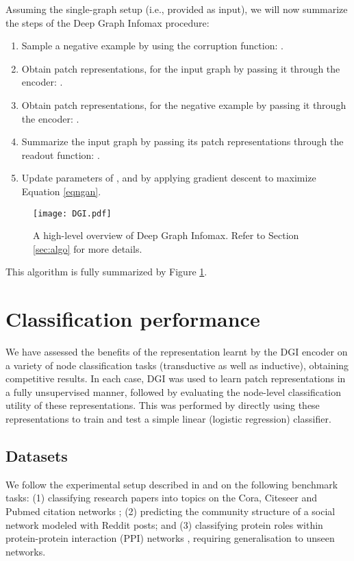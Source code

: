 \documentclass{article} \usepackage{iclr2019_conference,times}
\begin{document}
Assuming the single-graph setup (i.e.,  provided as input), we will now summarize the steps of the Deep Graph Infomax procedure:
\begin{enumerate}
	\item Sample a negative example by using the corruption function: .
	\item Obtain patch representations,  for the input graph by passing it through the encoder: .
	\item Obtain patch representations,  for the negative example by passing it through the encoder: .
	\item Summarize the input graph by passing its patch representations through the readout function: .
	\item Update parameters of ,  and  by applying gradient descent to maximize Equation \ref{eqngan}.
\end{enumerate}

\begin{figure}
\centering 
\texttt{[image: DGI.pdf]} 
\caption{A high-level overview of Deep Graph Infomax. Refer to Section \ref{sec:algo} for more details.}\label{fig:dgi}
\end{figure}

This algorithm is fully summarized by Figure \ref{fig:dgi}.

\section{Classification performance}

We have assessed the benefits of the representation learnt by the DGI encoder on a variety of node classification tasks (transductive as well as inductive), obtaining competitive results. In each case, DGI was used to learn patch representations in a fully unsupervised manner, followed by evaluating the node-level classification utility of these representations. This was performed by directly using these representations to train and test a simple linear (logistic regression) classifier. 



\subsection{Datasets}

We follow the experimental setup described in \citet{kipf2016semi} and \citet{hamilton2017inductive} on the following benchmark tasks: (1) classifying research papers into topics on the Cora, Citeseer and Pubmed citation networks \citep{sen2008collective}; (2) predicting the community structure of a social network modeled with Reddit posts; and (3) classifying protein roles within protein-protein interaction (PPI) networks \citep{zitnik2017predicting}, requiring generalisation to unseen networks. 
\end{document}
